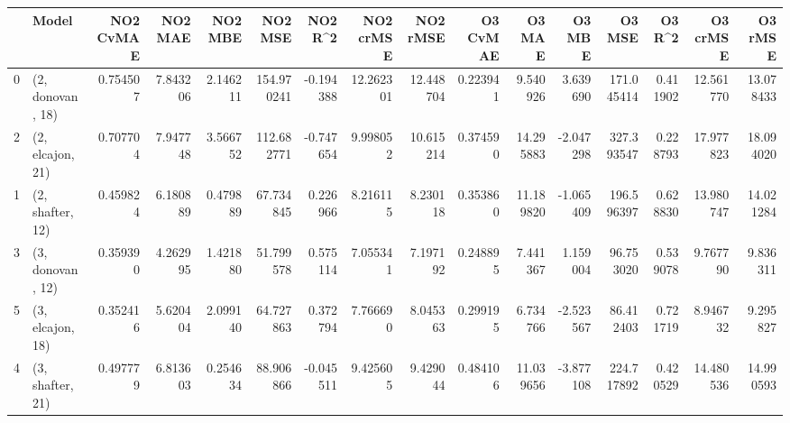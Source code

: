 \begin{tabular}{llrrrrrrrrrrrrrr}
\toprule
{} &             Model &  NO2 CvMAE &   NO2 MAE &   NO2 MBE &     NO2 MSE &   NO2 R\textasciicircum2 &  NO2 crMSE &   NO2 rMSE &  O3 CvMAE &     O3 MAE &    O3 MBE &      O3 MSE &    O3 R\textasciicircum2 &   O3 crMSE &    O3 rMSE \\
\midrule
0 &  (2, donovan, 18) &   0.754507 &  7.843206 &  2.146211 &  154.970241 & -0.194388 &  12.262301 &  12.448704 &  0.223941 &   9.540926 &  3.639690 &  171.045414 &  0.411902 &  12.561770 &  13.078433 \\
2 &  (2, elcajon, 21) &   0.707704 &  7.947748 &  3.566752 &  112.682771 & -0.747654 &   9.998052 &  10.615214 &  0.374590 &  14.295883 & -2.047298 &  327.393547 &  0.228793 &  17.977823 &  18.094020 \\
1 &  (2, shafter, 12) &   0.459824 &  6.180889 &  0.479889 &   67.734845 &  0.226966 &   8.216115 &   8.230118 &  0.353860 &  11.189820 & -1.065409 &  196.596397 &  0.628830 &  13.980747 &  14.021284 \\
3 &  (3, donovan, 12) &   0.359390 &  4.262995 &  1.421880 &   51.799578 &  0.575114 &   7.055341 &   7.197192 &  0.248895 &   7.441367 &  1.159004 &   96.753020 &  0.539078 &   9.767790 &   9.836311 \\
5 &  (3, elcajon, 18) &   0.352416 &  5.620404 &  2.099140 &   64.727863 &  0.372794 &   7.766690 &   8.045363 &  0.299195 &   6.734766 & -2.523567 &   86.412403 &  0.721719 &   8.946732 &   9.295827 \\
4 &  (3, shafter, 21) &   0.497779 &  6.813603 &  0.254634 &   88.906866 & -0.045511 &   9.425605 &   9.429044 &  0.484106 &  11.039656 & -3.877108 &  224.717892 &  0.420529 &  14.480536 &  14.990593 \\
\bottomrule
\end{tabular}
